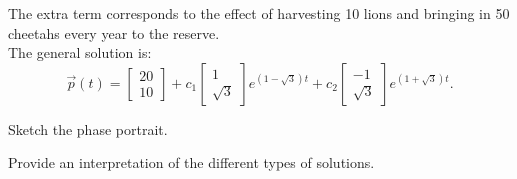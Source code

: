 	The extra term corresponds to the effect of harvesting 10 lions and bringing in 50 cheetahs every year to the reserve. \\
	
	The general solution is:
	$$
	\vec{p}(t) = \begin{bmatrix} 20 \\ 10 \end{bmatrix} +
		c_1 \begin{bmatrix} 1 \\ \sqrt{3} \end{bmatrix} e^{(1-\sqrt{3})t} + c_2 \begin{bmatrix} -1 \\ \sqrt{3} \end{bmatrix} e^{(1+\sqrt{3})t}.
	$$
\begin{parts}
	\item Sketch the phase portrait.
	\item Provide an interpretation of the different types of solutions.
\end{parts}



\bookonlynewpage

